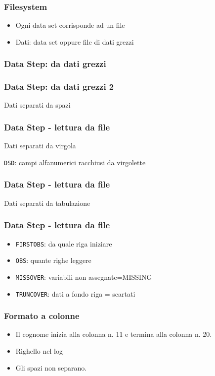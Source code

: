 \documentclass[aspectratio=169]{beamer}
\begin{document}
\begin{frame}\frametitle{Filesystem}
  \begin{itemize}
  \item
    Ogni data set corrisponde ad un file
  \item
    Dati: data set oppure file di dati grezzi
  \end{itemize}
\end{frame}

\begin{frame}[fragile]\frametitle{Data Step: da dati grezzi}
\end{frame}

\begin{frame}[fragile]\frametitle{Data Step: da dati grezzi 2}
  Dati separati da spazi
\end{frame}


\begin{frame}[fragile]\frametitle{Data Step - lettura da file }
  Dati separati da virgola

  \texttt{DSD}: campi alfanumerici racchiusi da virgolette
\end{frame}

\begin{frame}[fragile]\frametitle{Data Step - lettura da file }
  Dati separati da tabulazione
\end{frame}

\begin{frame}\frametitle{Data Step - lettura da file }
  \begin{itemize}
  \item
    \texttt{FIRSTOBS}: da quale riga iniziare
  \item
    \texttt{OBS}: quante righe leggere
  \item
    \texttt{MISSOVER}: variabili non assegnate=MISSING
  \item
    \texttt{TRUNCOVER}: dati a fondo riga = scartati
  \end{itemize}
\end{frame}

\begin{frame}[fragile]\frametitle{Formato a colonne}

  \begin{itemize}
  \item
    Il cognome inizia alla colonna n. 11 e termina alla colonna n. 20.
  \item
    Righello nel log
  \item
    Gli spazi non separano.
  \end{itemize}
\end{frame}
\end{document}
